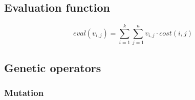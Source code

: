 \documentclass[12pt,a4paper,twoside]{article}
\theoremstyle{definition} %
\theoremstyle{plain} %
\numberwithin{equation}{section}  %
\begin{document}
\subsection{Evaluation function}

$$eval(v_{i,j}) = \sum\limits_{i=1}^{k} \sum\limits_{j=1}^{n} v_{i,j} \cdot cost(i,j)$$

\subsection{Genetic operators}

\subsubsection{Mutation}
\end{document}
